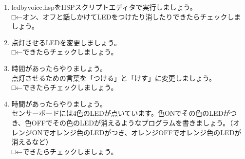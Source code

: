 \begin{tcolorbox}[title=\useOmetoi]
\begin{enumerate}
\item ledbyvoice.hspをHSPスクリプトエディタで実行しましょう。\\□←オン、オフと話しかけてLEDをつけたり消したりできたらチェックしましょう。
\item 点灯させるLEDを変更しましょう。\\□←できたらチェックしましょう。
\item 時間があったらやりましょう。\\点灯させるための言葉を「つける」と「けす」に変更しましょう。\\□←できたらチェックしましょう。
\item 時間があったらやりましょう。\\センサーボードには4色のLEDが点いています。色ONでその色のLEDがつき、色OFFでその色のLEDが消えるようなプログラムを書きましょう。（オレンジONでオレンジ色のLEDがつき、オレンジOFFでオレンジ色のLEDが消えるなど）\\□←できたらチェックしましょう。
\end{enumerate}
\end{tcolorbox}
